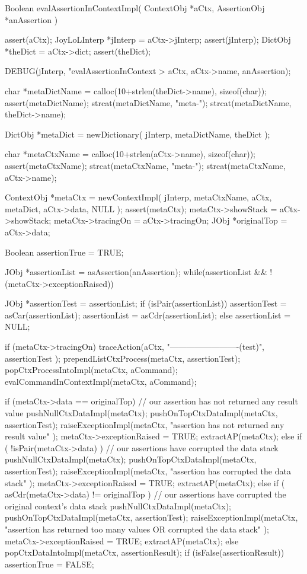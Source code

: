 \startCCode
Boolean evalAssertionInContextImpl(
  ContextObj   *aCtx,
  AssertionObj *anAssertion
) {
  assert(aCtx);
  JoyLoLInterp *jInterp = aCtx->jInterp;
  assert(jInterp);
  DictObj *theDict = aCtx->dict;
  assert(theDict);
  
  DEBUG(jInterp, "evalAssertionInContext > %
    aCtx, aCtx->name, anAssertion);

  char *metaDictName = calloc(10+strlen(theDict->name), sizeof(char));
  assert(metaDictName);
  strcat(metaDictName, "meta-");
  strcat(metaDictName, theDict->name);
  
  DictObj *metaDict = newDictionary(
    jInterp,
    metaDictName,
    theDict
  );
  
  char *metaCtxName = calloc(10+strlen(aCtx->name), sizeof(char));
  assert(metaCtxName);
  strcat(metaCtxName, "meta-");
  strcat(metaCtxName, aCtx->name);
  
  ContextObj *metaCtx = newContextImpl(
    jInterp,
    metaCtxName,
    aCtx,
    metaDict,
    aCtx->data,
    NULL
  );
  assert(metaCtx);
  metaCtx->showStack = aCtx->showStack;
  metaCtx->tracingOn = aCtx->tracingOn;
  JObj *originalTop  = aCtx->data;
  
  Boolean assertionTrue = TRUE;

  JObj *assertionList = asAssertion(anAssertion);
  while(assertionList && !(metaCtx->exceptionRaised)) {
    JObj *assertionTest = assertionList;
    if (isPair(assertionList)) {
      assertionTest = asCar(assertionList);
      assertionList = asCdr(assertionList);
    } else {
      assertionList = NULL;
    }

    if (metaCtx->tracingOn)
      traceAction(aCtx,
        "\n-------------------------\nevalAssertion(test)",
        assertionTest
      );
    prependListCtxProcess(metaCtx, assertionTest);
    popCtxProcessIntoImpl(metaCtx, aCommand);
    evalCommandInContextImpl(metaCtx, aCommand);
    
    if (metaCtx->data == originalTop) {
      // our assertion has not returned any result value
      pushNullCtxDataImpl(metaCtx);
      pushOnTopCtxDataImpl(metaCtx, assertionTest);
      raiseExceptionImpl(metaCtx,
        "assertion has not returned any result value"
        );
      metaCtx->exceptionRaised = TRUE;
      extractAP(metaCtx);
    } else if ( !isPair(metaCtx->data) ) {
      // our assertions have corrupted the data stack
      pushNullCtxDataImpl(metaCtx);
      pushOnTopCtxDataImpl(metaCtx, assertionTest);
      raiseExceptionImpl(metaCtx,
        "assertion has corrupted the data stack"
        );      
      metaCtx->exceptionRaised = TRUE;
      extractAP(metaCtx);
    } else if ( asCdr(metaCtx->data) != originalTop ) {
      // our assertions have corrupted the original context's data stack
      pushNullCtxDataImpl(metaCtx);
      pushOnTopCtxDataImpl(metaCtx, assertionTest);
      raiseExceptionImpl(metaCtx,
        "assertion has returned too many values OR corrupted the data stack"
        );
      metaCtx->exceptionRaised = TRUE;
      extractAP(metaCtx);
    } else {
      popCtxDataIntoImpl(metaCtx, assertionResult);
      if (isFalse(assertionResult)) {
        assertionTrue = FALSE;
      }
    }
  }
  
}
